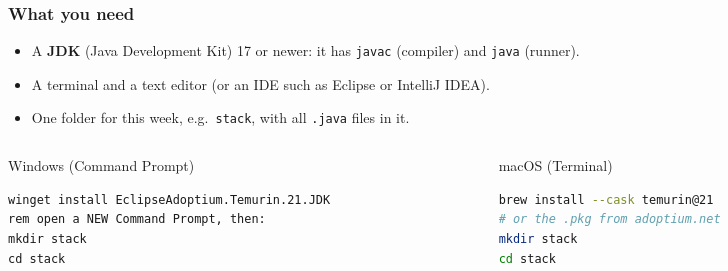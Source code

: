 \documentclass[aspectratio=169,10pt,compress]{beamer}
\begin{document}
\begin{frame}[t,fragile] \frametitle{What you need}
  \begin{itemize}
    \item A \textbf{JDK} (Java Development Kit) 17 or newer: it has \texttt{javac} (compiler) and \texttt{java} (runner).
    \item A terminal and a text editor (or an IDE such as Eclipse or IntelliJ IDEA).
    \item One folder for this week, e.g.\ \texttt{stack}, with all \texttt{.java} files in it.
  \end{itemize}
  \begin{columns}[T]
    \begin{column}{0.48\textwidth}
      \begin{block}{Windows (Command Prompt)}


\begin{lstlisting}[style=codesnippet, language={}, basicstyle=\ttfamily\scriptsize]
winget install EclipseAdoptium.Temurin.21.JDK
rem open a NEW Command Prompt, then:
mkdir stack
cd stack
\end{lstlisting}


      \end{block}
    \end{column}
    \begin{column}{0.48\textwidth}
      \begin{block}{macOS (Terminal)}


\begin{lstlisting}[style=codesnippet, language=bash, basicstyle=\ttfamily\scriptsize]
brew install --cask temurin@21
# or the .pkg from adoptium.net
mkdir stack
cd stack
\end{lstlisting}


      \end{block}
    \end{column}
  \end{columns}

\end{frame}

\end{document}
